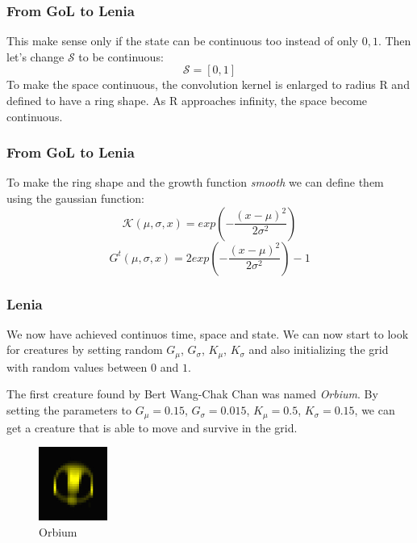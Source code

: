 \documentclass{beamer}
\begin{document}
\begin{frame}
  \frametitle{From GoL to Lenia}
  This make sense only if the state can be continuous too instead of only
  ${0,1}$. Then let's change $\mathcal{S}$ to be continuous:\\
  \begin{equation}
    \mathcal{S} = [0,1]
  \end{equation}
  To make the space continuous, the convolution
  kernel is enlarged to radius R and defined to have a ring shape. As R approaches
  infinity, the space become continuous.
\end{frame}

\begin{frame}
  \frametitle{From GoL to Lenia}
  To make the ring shape and the growth function \emph{smooth} we can define them using the gaussian function:\\
  \begin{equation}
    \mathcal{K}(\mu, \sigma, x) = exp(-\frac{(x-\mu)^2}{2\sigma^2})
  \end{equation}
  \begin{equation}
    G^t(\mu, \sigma, x) = 2exp(-\frac{(x-\mu)^2}{2\sigma^2}) - 1
  \end{equation}
\end{frame}

\begin{frame}
  \frametitle{Lenia}
  We now have achieved continuos time, space and state. We can now start to look for creatures by setting random $G_\mu$, $G_\sigma$, $K_\mu$, $K_\sigma$ and also initializing the grid with random values between $0$ and $1$.
\end{frame}

\begin{frame}
  The first creature found by Bert Wang-Chak Chan was named \emph{Orbium}.
  By setting the parameters to $G_\mu = 0.15$, $G_\sigma = 0.015$, $K_\mu =
  0.5$, $K_\sigma = 0.15$, we can get a creature that is able to move and
  survive in the grid.
  \begin{figure}
    \begin{center}
      \includegraphics[width=0.2\textwidth]{./orbium.jpg}
    \end{center}
    \caption{Orbium}
  \end{figure}
\end{frame}
\end{document}
